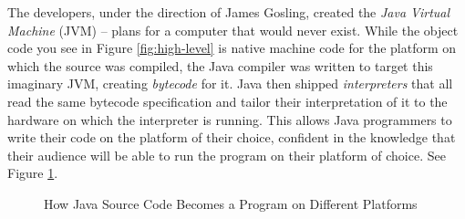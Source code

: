The developers, under the direction of James Gosling, created the \textit{Java Virtual Machine} (JVM) -- plans for a computer that would never exist.  While the object code you see in Figure \ref{fig:high-level} is native machine code for the platform on which the source was compiled, the Java compiler was written to target this imaginary JVM, creating \textit{bytecode} for it.  Java then shipped \textit{interpreters} that all read the same bytecode specification and tailor their interpretation of it to the hardware on which the interpreter is running.  This allows Java programmers to write their code on the platform of their choice, confident in the knowledge that their audience will be able to run the program on their platform of choice.  See Figure \ref{fig:java-compilation}.

\begin{figure}[ht]
    \begin{center}
    \end{center}
    \caption{How Java Source Code Becomes a Program on Different Platforms}
    \label{fig:java-compilation}
\end{figure}

